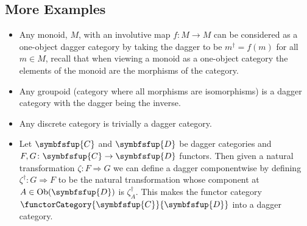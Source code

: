 \documentclass[fleqn]{NotesClass}
\newcommand{\cat}[1]{\symbfsfup{#1}}
\DeclareMathOperator{\Ob}{Ob}
\newcommand{\naturalTransformation}{\Rightarrow}
\begin{document}
    \subsection{More Examples}
    \begin{exm}{}{}
        \begin{itemize}
            \item Any monoid, \(M\), with an involutive map \(f \colon M \to M\) can be considered as a one-object dagger category by taking the dagger to be \(m^\dagger = f(m)\) for all \(m \in M\), recall that when viewing a monoid as a one-object category the elements of the monoid are the morphisms of the category.
            \item Any groupoid (category where all morphisms are isomorphisms) is a dagger category with the dagger being the inverse.
            \item Any discrete category is trivially a dagger category.
            \item Let \(\cat{C}\) and \(\cat{D}\) be dagger categories and \(F, G \colon \cat{C} \to \cat{D}\) functors.
            Then given a natural transformation \(\zeta\colon F \naturalTransformation G\) we can define a dagger componentwise by defining \(\zeta^\dagger\colon G \naturalTransformation F\) to be the natural transformation whose component at \(A \in \Ob(\cat{D})\) is \(\zeta_A^\dagger\).
            This makes the functor category \(\functorCategory{\cat{C}}{\cat{D}}\) into a dagger category.
        \end{itemize}
    \end{exm}
    
\end{document}
